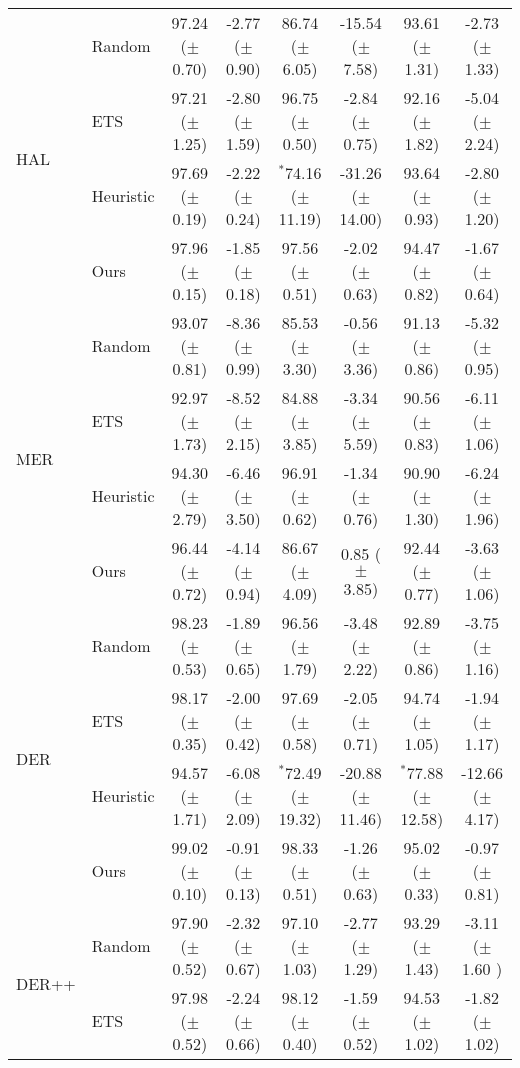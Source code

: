 \begin{table}[t]
{\begin{tabular}{l l c c c c c c}
        \multirow{4}{*}{HAL} & Random & 97.24 ($\pm$ 0.70) & -2.77 ($\pm$ 0.90) & 86.74 ($\pm$ 6.05) & -15.54 ($\pm$ 7.58) & 93.61 ($\pm$ 1.31) & -2.73 ($\pm$ 1.33) \\
         & ETS & 97.21 ($\pm$ 1.25) & -2.80 ($\pm$ 1.59) & 96.75 ($\pm$ 0.50) & -2.84 ($\pm$ 0.75) & 92.16 ($\pm$ 1.82) &  -5.04 ($\pm$ 2.24) \\
         & Heuristic & 97.69 ($\pm$ 0.19) & -2.22 ($\pm$ 0.24) & $^{*}$74.16 ($\pm$ 11.19) & -31.26 ($\pm$ 14.00) & 93.64 ($\pm$ 0.93) & -2.80 ($\pm$ 1.20) \\
         & Ours & 97.96 ($\pm$ 0.15) & -1.85 ($\pm$ 0.18) & 97.56 ($\pm$ 0.51) & -2.02 ($\pm$ 0.63) & 94.47 ($\pm$ 0.82) &  -1.67 ($\pm$ 0.64) \\
        \midrule 
        \multirow{4}{*}{MER} & Random & 93.07 ($\pm$ 0.81)  & -8.36 ($\pm$ 0.99) & 85.53 ($\pm$ 3.30) & -0.56 ($\pm$ 3.36) & 91.13 ($\pm$ 0.86) & -5.32 ($\pm$ 0.95) \\
         & ETS & 92.97 ($\pm$ 1.73) &  -8.52 ($\pm$ 2.15) & 84.88 ($\pm$ 3.85) & -3.34 ($\pm$ 5.59) & 90.56 ($\pm$ 0.83) & -6.11 ($\pm$ 1.06) \\
         & Heuristic & 94.30 ($\pm$ 2.79) & -6.46 ($\pm$ 3.50) & 96.91 ($\pm$ 0.62) & -1.34 ($\pm$ 0.76) & 90.90 ($\pm$ 1.30) & -6.24 ($\pm$ 1.96) \\
         & Ours & 96.44 ($\pm$ 0.72)  & -4.14 ($\pm$ 0.94)  & 86.67 ($\pm$ 4.09) & 0.85 ($\pm$ 3.85)  & 92.44 ($\pm$ 0.77) & -3.63 ($\pm$ 1.06) \\
        \midrule 
        \multirow{4}{*}{DER} & Random & 98.23 ($\pm$ 0.53) & -1.89 ($\pm$ 0.65) & 96.56 ($\pm$ 1.79) & -3.48 ($\pm$ 2.22) & 92.89 ($\pm$ 0.86) & -3.75 ($\pm$ 1.16) \\
         & ETS & 98.17 ($\pm$ 0.35) & -2.00 ($\pm$ 0.42) & 97.69 ($\pm$ 0.58) & -2.05 ($\pm$ 0.71) & 94.74 ($\pm$ 1.05) & -1.94 ($\pm$ 1.17) \\
         & Heuristic & 94.57 ($\pm$ 1.71) & -6.08 ($\pm$ 2.09) & $^{*}$72.49 ($\pm$ 19.32) & -20.88 ($\pm$ 11.46) & $^{*}$77.88 ($\pm$ 12.58) & -12.66 ($\pm$ 4.17) \\
         & Ours & 99.02 ($\pm$ 0.10) & -0.91 ($\pm$ 0.13) & 98.33 ($\pm$ 0.51) & -1.26 ($\pm$ 0.63) & 95.02 ($\pm$ 0.33) & -0.97 ($\pm$ 0.81) \\
        \midrule
        \multirow{4}{*}{DER++} & Random & 97.90 ($\pm$ 0.52) & -2.32 ($\pm$ 0.67) & 97.10 ($\pm$ 1.03) & -2.77 ($\pm$ 1.29) & 93.29 ($\pm$ 1.43) & -3.11 ($\pm$ 1.60 ) \\
         & ETS & 97.98 ($\pm$ 0.52) & -2.24 ($\pm$ 0.66) & 98.12 ($\pm$ 0.40) & -1.59 ($\pm$ 0.52) & 94.53 ($\pm$ 1.02) & -1.82 ($\pm$ 1.02) \\

\end{tabular}}
\end{table}
